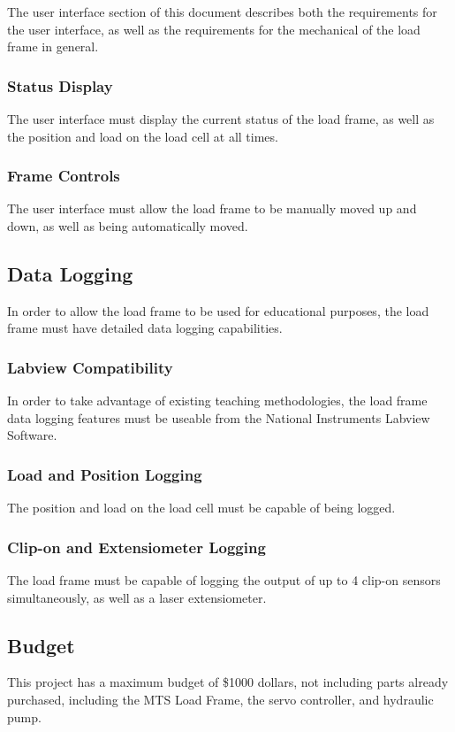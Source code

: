 \documentclass{article}
\begin{document}
The user interface section of this document describes both the
requirements for the user interface, as well as the requirements for
the mechanical of the load frame in general.

\subsubsection{Status Display} 

The user interface must display the current status of the load frame,
as well as the position and load on the load cell at all times.

\subsubsection{Frame Controls} 

The user interface must allow the load frame to be manually moved up
and down, as well as being automatically moved.

\subsection{Data Logging}

In order to allow the load frame to be used for educational purposes,
the load frame must have detailed data logging capabilities. 

\subsubsection{Labview Compatibility}

In order to take advantage of existing teaching methodologies, the
load frame data logging features must be useable from the National
Instruments Labview Software. 

\subsubsection{Load and Position Logging}

The position and load on the load cell must be capable of being logged. 

\subsubsection{Clip-on and Extensiometer Logging}

The load frame must be capable of logging the output of up to 4
clip-on sensors simultaneously, as well as a laser extensiometer.

\subsection{Budget}
This project has a maximum budget of \$1000 dollars, not including
parts already purchased, including the MTS Load Frame, the servo
controller, and hydraulic pump. 
\end{document}

